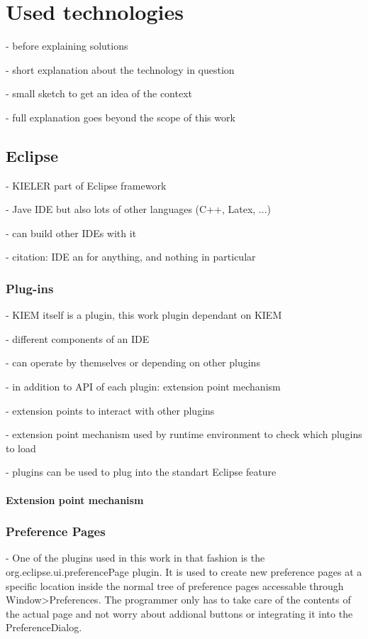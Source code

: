 \chapter{Used technologies}
\label{chapter:ConfTechnology}
- before explaining solutions

- short explanation about the technology in question

- small sketch to get an idea of the context

- full explanation goes beyond the scope of this work

\section{Eclipse}
- KIELER part of Eclipse framework

- Jave IDE but also lots of other languages (C++, Latex, ...)

- can build other IDEs with it

- citation: IDE an for anything, and nothing in particular \cite{eclipseOverview}

\subsection{Plug-ins}
- \ac{KIEM} itself is a plugin, this work plugin dependant on \ac{KIEM}

- different components of an \ac{IDE} 

- can operate by themselves or depending on other plugins

- in addition to \ac{API} of each plugin: extension point mechanism

- extension points to interact with other plugins

- extension point mechanism used by runtime environment to check which plugins to load

- plugins can be used to plug into the standart Eclipse feature
\subsubsection{Extension point mechanism}
\label{section:ConfTechnologyExtension}


\subsection{Preference Pages}
- One of the plugins used in this work in that fashion is the org.eclipse.ui.preferencePage
plugin. It is used to create new preference pages at a specific location inside the
normal tree of preference pages accessable through Window>Preferences.
The programmer only has to take care of the contents of the actual page and not worry
about addional buttons or integrating it into the PreferenceDialog.

